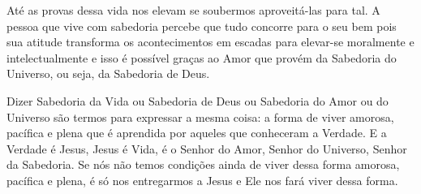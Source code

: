 \emdash{}Até as provas dessa vida nos elevam se soubermos aproveitá-las para tal. A pessoa que vive com sabedoria percebe que tudo concorre para o seu bem pois sua atitude transforma os acontecimentos em escadas para elevar-se moralmente e intelectualmente e isso é possível graças ao Amor que provém da Sabedoria do Universo, ou seja, da Sabedoria de Deus.

\emdash{}Dizer Sabedoria da Vida ou Sabedoria de Deus ou Sabedoria do Amor ou do Universo são termos para expressar a mesma coisa: a forma de viver amorosa, pacífica e plena que é aprendida por aqueles que conheceram a Verdade. E a Verdade é Jesus, Jesus é Vida, é o Senhor do Amor, Senhor do Universo, Senhor da Sabedoria. Se nós não temos condições ainda de viver dessa forma amorosa, pacífica e plena, é só nos entregarmos a Jesus e Ele nos fará viver dessa forma.